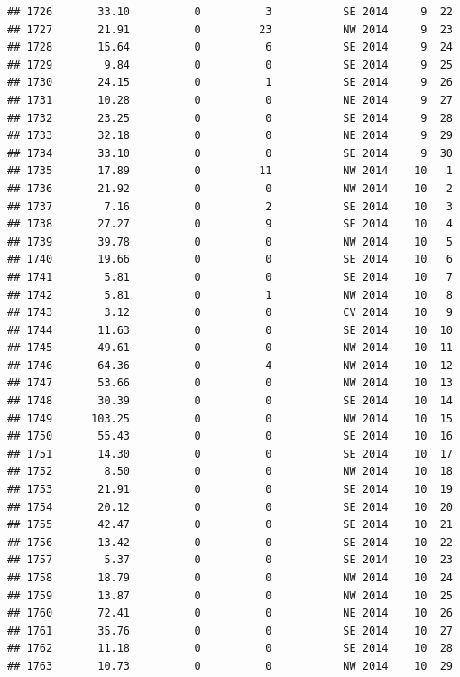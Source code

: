 \documentclass[
]{article}
\begin{document}
\begin{verbatim}
## 1726       33.10          0          3           SE 2014     9  22
## 1727       21.91          0         23           NW 2014     9  23
## 1728       15.64          0          6           SE 2014     9  24
## 1729        9.84          0          0           SE 2014     9  25
## 1730       24.15          0          1           SE 2014     9  26
## 1731       10.28          0          0           NE 2014     9  27
## 1732       23.25          0          0           SE 2014     9  28
## 1733       32.18          0          0           NE 2014     9  29
## 1734       33.10          0          0           SE 2014     9  30
## 1735       17.89          0         11           NW 2014    10   1
## 1736       21.92          0          0           NW 2014    10   2
## 1737        7.16          0          2           SE 2014    10   3
## 1738       27.27          0          9           SE 2014    10   4
## 1739       39.78          0          0           NW 2014    10   5
## 1740       19.66          0          0           SE 2014    10   6
## 1741        5.81          0          0           SE 2014    10   7
## 1742        5.81          0          1           NW 2014    10   8
## 1743        3.12          0          0           CV 2014    10   9
## 1744       11.63          0          0           SE 2014    10  10
## 1745       49.61          0          0           NW 2014    10  11
## 1746       64.36          0          4           NW 2014    10  12
## 1747       53.66          0          0           NW 2014    10  13
## 1748       30.39          0          0           SE 2014    10  14
## 1749      103.25          0          0           NW 2014    10  15
## 1750       55.43          0          0           SE 2014    10  16
## 1751       14.30          0          0           SE 2014    10  17
## 1752        8.50          0          0           NW 2014    10  18
## 1753       21.91          0          0           SE 2014    10  19
## 1754       20.12          0          0           SE 2014    10  20
## 1755       42.47          0          0           SE 2014    10  21
## 1756       13.42          0          0           SE 2014    10  22
## 1757        5.37          0          0           SE 2014    10  23
## 1758       18.79          0          0           NW 2014    10  24
## 1759       13.87          0          0           NW 2014    10  25
## 1760       72.41          0          0           NE 2014    10  26
## 1761       35.76          0          0           SE 2014    10  27
## 1762       11.18          0          0           SE 2014    10  28
## 1763       10.73          0          0           NW 2014    10  29

\end{verbatim}
\end{document}
